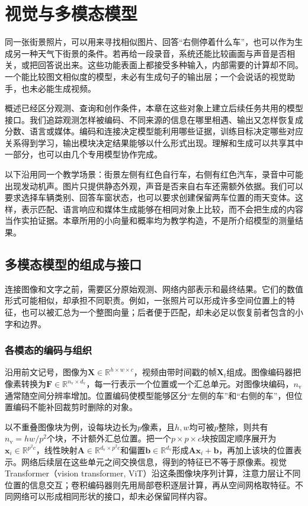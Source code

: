 \chapter{视觉与多模态模型}
\label{chap:vision-multimodal-models}

同一张街景照片，可以用来寻找相似图片、回答“右侧停着什么车”，也可以作为生成另一种天气下街景的条件。若再给一段录音，系统还能比较画面与声音是否相关，或把回答说出来。这些功能表面上都接受多种输入，内部需要的计算却不同。一个能比较图文相似度的模型，未必有生成句子的输出层；一个会说话的视觉助手，也未必能生成视频。

概述已经区分观测、查询和创作条件，本章在这些对象上建立后续任务共用的模型接口。我们追踪观测怎样被编码、不同来源的信息在哪里相遇、输出又怎样恢复成分数、语言或媒体。编码和连接决定模型能利用哪些证据，训练目标决定哪些对应关系得到学习，输出模块决定结果能够以什么形式出现。理解和生成可以共享其中一部分，也可以由几个专用模型协作完成。

以下沿用同一个教学场景：街景左侧有红色自行车，右侧有红色汽车，录音中可能出现发动机声。图片只提供静态外观，声音是否来自右车还需额外依据。我们可以要求选择车辆类别、回答车窗状态，也可以要求创建保留两车位置的雨天变体。这样，表示匹配、语言响应和媒体生成能够在相同对象上比较，而不会把生成的内容当作实拍证据。本章所用的小向量和概率均为教学构造，不是所介绍模型的测量结果。

\section{多模态模型的组成与接口}
\label{sec:vision-models-interfaces}

连接图像和文字之前，需要区分原始观测、网络内部表示和最终结果。它们的数值形式可能相似，却承担不同职责。例如，一张照片可以形成许多空间位置上的特征，也可以被汇总为一个整图向量；后者便于匹配，却未必足以恢复前者包含的小字和边界。

\subsection{各模态的编码与组织}
\label{sec:vision-models-encoding}

沿用前文记号，图像为$\bm{X}\in\mathbb{R}^{h\times w\times c}$，视频由带时间戳的帧$\bm{X}_t$组成。图像编码器把像素转换为$\bm{F}\in\mathbb{R}^{n_{\mathrm v}\times d_{\mathrm v}}$，每一行表示一个位置或一个汇总单元。对图像块编码，$n_{\mathrm v}$通常随空间分辨率增加。位置编码使模型能够区分“左侧的车”和“右侧的车”，但位置编码不能补回裁剪时删除的对象。

以不重叠图像块为例，设每块边长为$p$像素，且$h,w$均可被$p$整除，则共有$n_{\mathrm v}=hw/p^2$个块，不计额外汇总位置。把一个$p\times p\times c$块按固定顺序展开为$\bm x_i\in\mathbb R^{p^2c}$，线性映射$\bm A\in\mathbb R^{d_{\mathrm v}\times p^2c}$和偏置$\bm b\in\mathbb R^{d_{\mathrm v}}$形成$\bm A\bm x_i+\bm b$，再加上该块的位置表示。网络后续层在这些单元之间交换信息，得到的特征已不等于原像素。视觉Transformer（vision transformer, ViT）沿这条图像块序列计算，注意力层让不同位置的信息交互；卷积编码器则先用局部卷积逐层计算，再从空间网格取特征。不同网络可以形成相同形状的接口，却未必保留同样内容。

